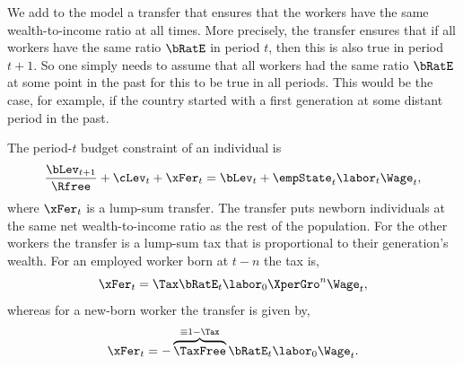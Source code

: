 \documentclass[titlepage]{\econtex}\newcommand{\texname}{cjSOE}
\begin{document}
We add to the model a transfer that ensures that the workers have the same wealth-to-income ratio at all times. More precisely, the transfer ensures that if all workers have the same ratio $\bRatE$ in period $t$, then this is also true in period $t+1$. So one simply needs to assume that all workers had the same ratio $\bRatE$ at some point in the past for this to be true in all periods. This would be the case, for example, if the country started with a first generation at some distant period in the past.

The period-$t$ budget constraint of an individual is
\begin{equation*}
\frac{\bLev_{t+1}}{\Rfree}+ \cLev_{t}+\xFer_{t}=\bLev_{t}+\empState_{t} \labor_{t} \Wage_t,
\label{eq:ibcStakes}
\end{equation*}
where $\xFer_{t}$ is a lump-sum transfer. The transfer puts newborn individuals at the same net wealth-to-income ratio as the rest of the population. For the other workers the transfer is a lump-sum tax that is proportional to their generation's wealth. For an employed worker born at $t-n$ the tax is,
\begin{equation}
\xFer_{t}=\Tax \bRatE_t \labor_0 \XperGro^{n} \Wage_t, \label{eq:xFerE}
\end{equation}
whereas for a new-born worker the transfer is given by,
\begin{equation}
\xFer_{t}=-\overbrace{\TaxFree}^{\equiv 1-\Tax} \bRatE_t \labor_0 \Wage_t. \label{eq:xFerAtBirth}
\end{equation}
\end{document}
